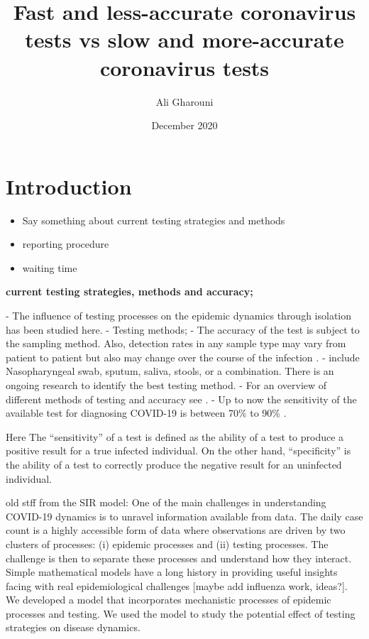 \documentclass{article}
\title{Fast and less-accurate coronavirus tests vs slow and more-accurate coronavirus tests }
\author{Ali Gharouni}
\date{December 2020}
\theoremstyle{definition} %
\begin{document}
\maketitle
\section{Introduction}
\begin{itemize}
  \item Say something about current testing strategies and methods
  \item reporting procedure
  \item waiting time
\end{itemize}



{\bf current testing strategies, methods and accuracy;}

- The influence of testing processes on the epidemic dynamics through isolation has been studied here.
- Testing methods;
    - The accuracy of the test is subject to the sampling method. Also, detection rates in any sample type may vary from patient to patient but also may change over the course of the infection \citep{patel2020report}.
    - include Nasopharyngeal swab, sputum, saliva, stools, or a combination. There is an ongoing research to identify the best testing method.
    - For an overview of different methods of testing and accuracy see \cite{machado2021main}.
    - Up to now the sensitivity of the available test for diagnosing COVID-19 is between 70\% to 90\% \citep{woloshin2020false.}.


Here The ``sensitivity'' of a test is defined as the ability of a test to produce a positive result for a true infected individual. On the other hand, ``specificity'' is the ability of a test to correctly produce the negative result for an uninfected individual.  








old stff from the SIR model:
One of the main challenges in understanding COVID-19 dynamics is to unravel information available from data. The daily case count is a highly accessible form of data where observations are driven by two clusters of processes: (i) epidemic processes and (ii) testing processes. The challenge is then to separate these processes and understand how they interact. Simple mathematical models have a long history in providing useful insights facing with real epidemiological challenges \citep{ross1911prevention} [maybe add influenza work, ideas?]. We developed a model that incorporates mechanistic processes of epidemic processes and testing. We used the model to study the potential effect of testing strategies on disease dynamics.
\end{document}
